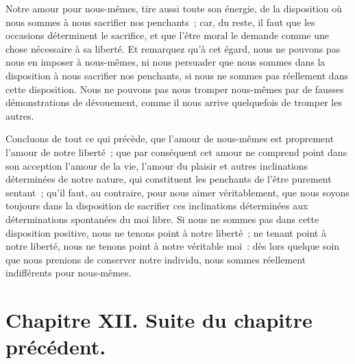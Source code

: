 \documentclass[french,twoside]{book} %
\newcommand\chapteropen{} %
\newcommand\chapterclose{} %
\begin{document}
Notre amour pour nous-mêmes, tire aussi toute son énergie, de la disposition où nous sommes à nous sacrifier nos penchants ; car, du reste, il faut que les occasions déterminent le sacrifice, et que l’être moral le demande comme une chose nécessaire à sa liberté. Et remarquez qu’à cet égard, nous ne pouvons pas nous en imposer à nous-mêmes, ni nous persuader que nous sommes dans la disposition à nous sacrifier nos penchants, si nous ne sommes pas réellement dans cette disposition. Nous ne pouvons pas nous tromper nous-mêmes par de fausses démonstrations de dévouement, comme il nous arrive quelquefois de tromper les autres.\par
Concluons de tout ce qui précède, que l’amour de nous-mêmes est proprement l’amour de notre liberté ; que par conséquent cet amour ne comprend point dans son acception l’amour de la vie, l’amour du plaisir et autres inclinations déterminées de notre nature, qui constituent les penchants de l’être purement sentant ; qu’il faut, au contraire, pour nous aimer véritablement, que nous soyons toujours dans la disposition de sacrifier ces inclinations déterminées aux déterminations spontanées du moi libre. Si nous ne sommes pas dans cette disposition positive, nous ne tenons point à notre liberté ; ne tenant point à notre liberté, nous ne tenons point à notre véritable moi : dès lors quelque soin que nous prenions de conserver notre individu, nous sommes réellement indifférents pour nous-mêmes.
\chapterclose


\chapteropen
\chapter[{Chapitre XII. Suite du chapitre précédent.}]{Chapitre XII. Suite du chapitre précédent.}\renewcommand{\leftmark}{Chapitre XII. Suite du chapitre précédent.}
\end{document}
